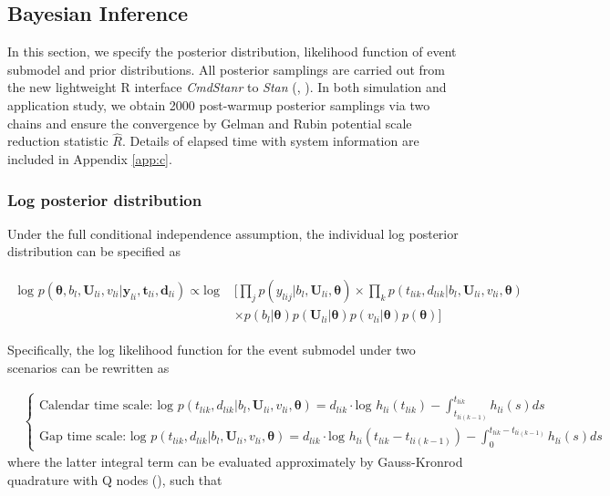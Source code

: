 \subsection{Bayesian Inference}

In this section, we specify the posterior distribution, likelihood function of event submodel and prior distributions. All posterior samplings are carried out from the new lightweight R interface \emph{CmdStanr} to \emph{Stan} (\cite{Gelman2013a}, \cite{StanManual}). In both simulation and application study, we obtain 2000 post-warmup posterior samplings via two chains and ensure the convergence by Gelman and Rubin potential scale reduction statistic $\widehat{R}$. Details of elapsed time with system information are included in Appendix \ref{app:c}.  

\subsubsection{Log posterior distribution}

Under the full conditional independence assumption, the individual log posterior distribution can be specified as

\begin{align}
    \begin{split}
        \mbox{log } p(\bm{\theta},b_l,\bm{U}_{li},v_{li}|\bm{y}_{li}, \bm{t}_{li}, \bm{d}_{li}) \propto \mbox{log } & 
        \Big[\prod_jp(y_{lij}|b_l,\bm{U}_{li},\bm{\theta})
        \times \prod_kp(t_{lik},d_{lik}|b_l,\bm{U}_{li},v_{li},\bm{\theta}) \\ & 
        \times p(b_l|\bm{\theta})p(\bm{U}_{li}|\bm{\theta})p(v_{li}|\bm{\theta})p(\bm{\theta})\Big]
    \end{split}
\end{align}

Specifically, the log likelihood function for the event submodel under two scenarios can be rewritten as

\begin{align}
&  \left \{\begin{array}{ll}
 \mbox{Calendar time scale: } \mbox{log } p(t_{lik}, d_{lik}|b_l,\bm{U}_{li},v_{li},\bm{\theta}) = d_{lik} \cdot \mbox{log } h_{li}(t_{lik}) - \int^{t_{lik}}_{t_{li(k-1)}} h_{li}(s)ds \\
 \mbox{Gap time scale: }\mbox{log } p(t_{lik}, d_{lik}|b_l,\bm{U}_{li},v_{li},\bm{\theta}) = d_{lik} \cdot \mbox{log } h_{li}(t_{lik}-t_{li(k-1)}) - \int^{t_{lik}-t_{li(k-1)}}_{0} h_{li}(s)ds
\end{array}\right.
\end{align}
where the latter integral term can be evaluated approximately by Gauss-Kronrod quadrature with Q nodes (\cite{Laurie1997}), such that 

